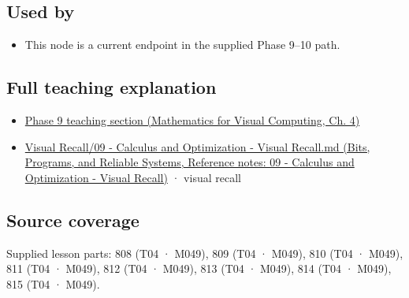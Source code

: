 \subsection{Used by}\label{appendix-d9f70bdfbc92-used-by}

\begin{itemize}
\tightlist
\item
  This node is a current endpoint in the supplied Phase 9--10 path.
\end{itemize}

\subsection{Full teaching explanation}\label{appendix-d9f70bdfbc92-full-teaching-explanation}

\begin{itemize}
\tightlist
\item
  \href{../02-Mathematics-for-Visual-Computing/main.pdf\#nameddest=01-foundations-i-ch020-functions-limits-continuity-and-scalar-change}{Phase 9 teaching section (Mathematics for Visual Computing, Ch. 4)}
\item
  \href{../01-Bits-Programs-and-Reliable-Systems/main.pdf\#nameddest=appendix-adf48f5dc5c1}{Visual Recall/09 - Calculus and Optimization - Visual Recall.md (Bits, Programs, and Reliable Systems, Reference notes: 09 - Calculus and Optimization - Visual Recall)} · visual recall
\end{itemize}

\subsection{Source coverage}\label{appendix-d9f70bdfbc92-source-coverage}

Supplied lesson parts: 808 (T04 · M049), 809 (T04 · M049), 810 (T04 · M049), 811 (T04 · M049), 812 (T04 · M049), 813 (T04 · M049), 814 (T04 · M049), 815 (T04 · M049).
